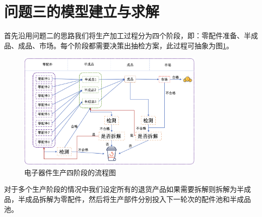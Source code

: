 \documentclass[withoutpreface,bwprint]{cumcmthesis} %
\begin{document}
\section{问题三的模型建立与求解}
首先沿用问题二的思路我们将生产加工过程分为四个阶段，即：零配件准备、半成品、成品、市场。每个阶段都需要决策出抽检方案，此过程可抽象为图\ref{fig:pro3-1}。
\begin{figure}[H]
	\centering
	\includegraphics[width=0.8\textwidth]{Fig/pro3-1.png}
	\caption{电子器件生产四阶段的流程图}
	\label{fig:pro3-1}
\end{figure}
对于多个生产阶段的情况中我们设定所有的退货产品如果需要拆解则拆解为半成品，半成品拆解为零配件，然后将生产部件分别投入下一轮次的配件池和半成品池。
\end{document}
